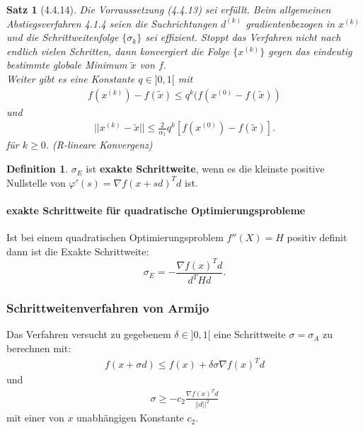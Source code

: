\documentclass[ngerman,halfparskip]{scrartcl}
\newtheorem*{satz}{Satz}
\theoremstyle{definition}
\newtheorem*{defin}{Definition}
\begin{document}
\begin{satz}[4.4.14] 
Die Vorraussetzung (4.4.13) sei erfüllt. Beim allgemeinen Abstiegsverfahren 4.1.4 seien die Suchrichtungen $d^{(k)}$ gradientenbezogen in $x^{(k)}$ und die Schrittweitenfolge $\{\sigma_k\}$ sei effizient. Stoppt das Verfahren nicht nach endlich vielen Schritten, dann konvergiert die Folge $\{x^{(k)}\}$ gegen das eindeutig bestimmte globale Minimum $\tilde x$ von $f$.\\
Weiter gibt es eine Konstante $q\in]0,1[$ mit \begin{gather*}\tag{4.4.8}
f(x^{(k)})-f(\tilde x)\leq q^k(f(x^{(0)}-f(\tilde x))
\end{gather*}
und \begin{gather*}\tag{4.4.9}
||x^{(k)}-\tilde x||\leq \frac 2{\alpha_1}q^k\left[ f(x^{(0)})-f(\tilde x) \right].
\end{gather*}
für $k\geq 0$. (R-lineare Konvergenz)

\end{satz}
\begin{defin}
$\sigma_E$ ist \textbf{exakte Schrittweite}, wenn es die kleinste positive Nullstelle von $\varphi '(s)=\nabla f(x+sd)^Td$ ist.
\end{defin}

\paragraph{exakte Schrittweite für quadratische Optimierungsprobleme} Ist bei einem quadratischen Optimierungsproblem $f''(X)=H$ positiv definit dann ist die Exakte Schrittweite:
$$\sigma_E=-\frac{\nabla f(x)^Td}{d^THd}.$$





\subsubsection*{Schrittweitenverfahren von Armijo} 

Das Verfahren versucht zu gegebenem $\delta \in ]0,1[$ eine Schrittweite $\sigma=\sigma_A$ zu berechnen mit:
\begin{gather*}\tag{4.5.6}
f(x+\sigma d)\leq f(x)+\delta \sigma \nabla f(x)^Td
\end{gather*}
und 
\begin{gather*}\tag{4.5.7}
\sigma \geq -c_2\frac{\nabla f(x)^Td}{||d||^2}
\end{gather*}
mit einer von $x$ unabhängigen Konstante $c_2$.
\end{document}
